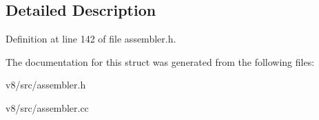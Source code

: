 \subsection{Detailed Description}


Definition at line 142 of file assembler.\+h.



The documentation for this struct was generated from the following files\+:\begin{DoxyCompactItemize}
\item 
v8/src/assembler.\+h\item 
v8/src/assembler.\+cc\end{DoxyCompactItemize}
